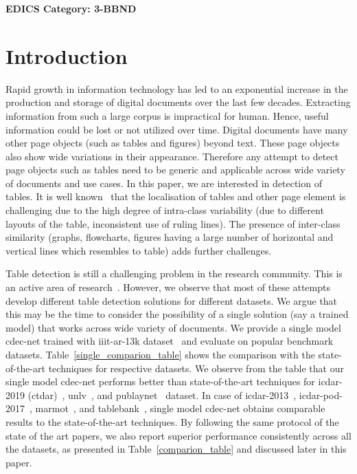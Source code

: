 \documentclass[a4paper,conference]{IEEEtran}
\begin{document}
\ifCLASSOPTIONpeerreview
 \begin{center} \bfseries EDICS Category: 3-BBND \end{center}
\fi
\IEEEpeerreviewmaketitle

\section{Introduction}

Rapid growth in information technology has led to an exponential increase in the production and storage of digital documents over the last few decades. Extracting information from such a large corpus is impractical for human. Hence, useful information could be lost or not utilized over time. Digital documents have many other page objects (such as tables and figures) beyond text. These page objects also show wide variations in
their appearance. Therefore any attempt to detect page objects such as tables need to be generic and applicable across wide variety of documents and use cases. In this paper, we are interested in detection of tables. 
It is well known~\cite{gilani2017table,schreiber2017deepdesrt,siddiqui2018decnt,sun2019faster,vo2018ensemble,arif2018table,li2019tablebank,younas2019ffd,zhong2019publaynet,saha2019graphical,casado2019benefits} that the localisation of tables and other page element is challenging due to the high degree of intra-class variability (due to different layouts of the table, inconsistent use of ruling lines). The presence of inter-class similarity (graphs, flowcharts, figures having a large number of horizontal and vertical lines which resembles to table) adds further challenges. 


Table detection is still a challenging problem in the research community. This is an active area of research~\cite{siddiqui2018decnt,sun2019faster,vo2018ensemble,arif2018table,li2019tablebank,younas2019ffd,zhong2019publaynet,saha2019graphical,casado2019benefits}. However, we observe that most of these attempts develop different table detection solutions for different datasets. We argue that this may be the time to consider the possibility of a single solution (say a trained model) that works across wide variety of documents. We provide a single model {\sc cd}e{\sc c-n}et trained with {\sc iiit-ar-13k} dataset~\cite{ajoy2020_das} and evaluate on popular benchmark datasets. Table~\ref{single_comparion_table} shows the comparison with the state-of-the-art techniques for respective datasets. We observe from the table that our single model {\sc cd}e{\sc c-n}et performs better than state-of-the-art techniques for {\sc icdar-2019} (c{\sc td}a{\sc r})~\cite{gao2019icdar}, {\sc unlv}~\cite{shahab2010open}, and {\sc p}ub{\sc l}ay{\sc n}et~\cite{zhong2019publaynet} dataset. In case of {\sc icdar-2013}~\cite{gobel2013icdar}, {\sc icdar-pod-2017}~\cite{gao2017icdar2017}, {\sc m}armot~\cite{fang2012dataset}, and {\sc t}able{\sc b}ank~\cite{li2019tablebank}, single model {\sc cd}e{\sc c-n}et obtains comparable results to the state-of-the-art techniques. By following the same protocol of the state of the art papers, we also report superior performance consistently across all the datasets, as presented in Table~\ref{comparion_table} and discussed later in this paper.
\end{document}
